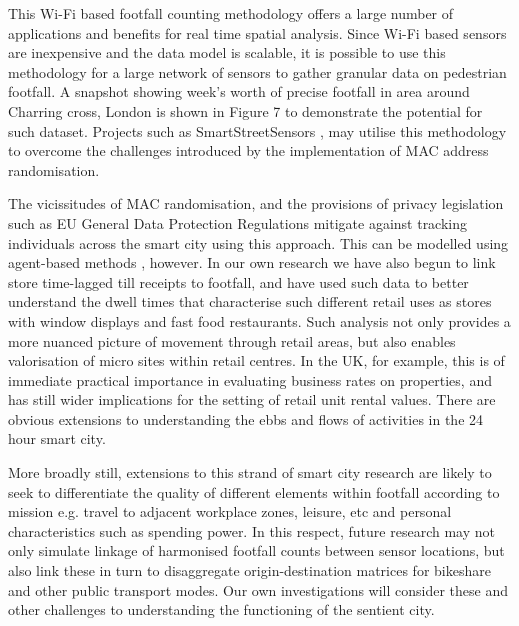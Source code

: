 This Wi-Fi based footfall counting methodology offers a large number of
applications and benefits for real time spatial analysis. Since Wi-Fi based
sensors are inexpensive and the data model is scalable, it is possible to use
this methodology for a large network of sensors to gather granular data on
pedestrian footfall. A snapshot showing week’s worth of precise footfall in area
around Charring cross, London is shown in Figure 7 to demonstrate the potential
for such dataset. Projects such as SmartStreetSensors \citep{cdrc2018consumer}, may utilise
this methodology to overcome the challenges introduced by the implementation of
MAC address randomisation.

The vicissitudes of MAC randomisation, and the provisions of privacy legislation
such as EU General Data Protection Regulations mitigate against tracking
individuals across the smart city using this approach.  This can be modelled
using agent-based methods \citep{heppenstall2011agent}, however. In our own research
we have also begun to link store time-lagged till receipts to footfall, and have
used such data to better understand the dwell times that characterise such
different retail uses as stores with window displays and fast food restaurants.
Such analysis not only provides a more nuanced picture of movement through
retail areas, but also enables valorisation of micro sites within retail
centres. In the UK, for example, this is of immediate practical importance in
evaluating business rates on properties, and has still wider implications for
the setting of retail unit rental values. There are obvious extensions to
understanding the ebbs and flows of activities in the 24 hour smart city.

More broadly still, extensions to this strand of smart city research are likely
to seek to differentiate the quality of different elements within footfall
according to mission e.g. travel to adjacent workplace zones, leisure, etc and
personal characteristics such as spending power. In this respect, future
research may not only simulate linkage of harmonised footfall counts between
sensor locations, but also link these in turn to disaggregate origin-destination
matrices for bikeshare and other public transport modes.  Our own investigations
will consider these and other challenges to understanding the functioning of the
sentient city.
